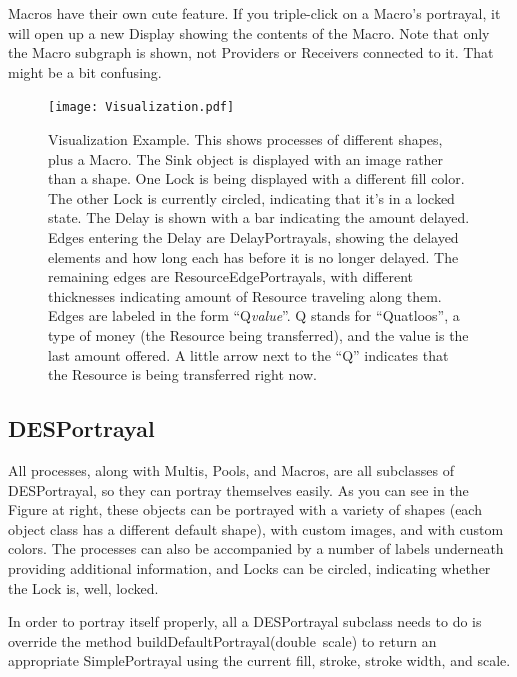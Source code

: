 \documentclass[twoside,10pt]{article}
\newcommand\method[1]{\hbox{\textsf{#1}}}
\begin{document}
Macros have their own cute feature.  If you triple-click on a Macro's portrayal, it will open up a new Display showing the contents of the Macro.  Note that only the Macro subgraph is shown, not Providers or Receivers connected to it.  That might be a bit confusing.


\begin{figure}
\vspace{-3em}\texttt{[image: Visualization.pdf]}
\vspace{-1em}
\caption{Visualization Example.  This shows processes of different shapes, plus a Macro.  The Sink object is displayed with an image rather than a shape.  One Lock is being displayed with a different fill color.  The other Lock is currently circled, indicating that it's in a locked state.  The Delay is shown with a bar indicating the amount delayed.  Edges entering the Delay are DelayPortrayals, showing the delayed elements and how long each has before it is no longer delayed.  The remaining edges are ResourceEdgePortrayals, with different thicknesses indicating amount of Resource traveling along them.  Edges are labeled in the form ``Q{\it value}''.  Q stands for ``Quatloos'', a type of money (the Resource being transferred), and the value is the last amount offered.  A little arrow next to the ``Q'' indicates that the Resource is being transferred right now.}
\vspace{-15em}
\label{visualization}
\end{figure}

\subsection{DESPortrayal}

All processes, along with Multis, Pools, and Macros, are all subclasses of DESPortrayal, so they can portray themselves easily.  As you can see in the Figure at right, these objects can be portrayed with a variety of shapes (each object class has a different default shape), with custom images, and with custom colors.  The processes can also be accompanied by a number of labels underneath providing additional information, and Locks can be circled, indicating whether the Lock is, well, locked.

In order to portray itself properly, all a DESPortrayal subclass needs to do is override the method \method{buildDefaultPortrayal(double scale)} to return an appropriate SimplePortrayal using the current fill, stroke, stroke width, and scale.  
\end{document}
